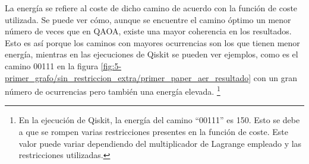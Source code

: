 \documentclass{article}
\begin{document}
La energía se refiere al coste de dicho camino de acuerdo con la función de coste utilizada. Se puede ver cómo, aunque se encuentre el camino óptimo un menor número de veces que en QAOA, existe una mayor coherencia en los resultados. Esto es así porque los caminos con mayores ocurrencias son los que tienen menor energía, mientras en las ejecuciones de Qiskit se pueden ver ejemplos, como es el camino 00111 en la figura \ref{fig:5-primer_grafo/sin_restriccion_extra/primer_paper_aer_resultado} con un gran número de ocurrencias pero también una energía elevada.
\footnote{En la ejecución de Qiskit, la energía del camino ``00111'' es 150. Esto se debe a que se rompen varias restricciones presentes en la función de coste. Este valor puede variar dependiendo del multiplicador de Lagrange empleado
  y las restricciones utilizadas.}
\end{document}
